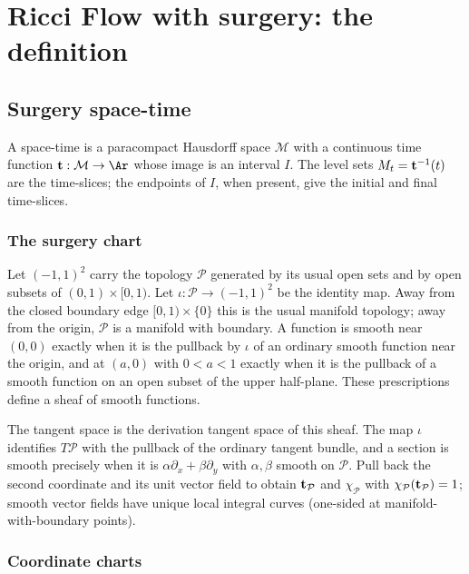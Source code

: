 \chapter{Ricci Flow with surgery: the definition}
\label{chap:ricci-flow-with-surgery}
\label{sect:surgery}

\section{Surgery space-time}

\begin{definition}
\label{def:space-time-general}
A space-time is a paracompact Hausdorff space ${\mathcal M}$ with a continuous
time function ${\bf t}:{\mathcal M}\to\Ar$ whose image is an interval $I$.
The level sets $M_t={\bf t}^{-1}(t)$ are the time-slices; the endpoints of $I$,
when present, give the initial and final time-slices.
\end{definition}

\subsection{The surgery chart}

Let $(-1,1)^2$ carry the topology ${\mathcal P}$ generated by its usual open
sets and by open subsets of $(0,1)\times[0,1)$. Let
$\iota:{\mathcal P}\to(-1,1)^2$ be the identity map. Away from the closed
boundary edge $[0,1)\times\{0\}$ this is the usual manifold topology; away
from the origin, ${\mathcal P}$ is a manifold with boundary. A function is
smooth near $(0,0)$ exactly when it is the pullback by $\iota$ of an ordinary
smooth function near the origin, and at $(a,0)$ with $0<a<1$ exactly when it is
the pullback of a smooth function on an open subset of the upper half-plane.
These prescriptions define a sheaf of smooth functions.

The tangent space is the derivation tangent space of this sheaf. The map
$\iota$ identifies $T{\mathcal P}$ with the pullback of the ordinary tangent
bundle, and a section is smooth precisely when it is
$\alpha\partial_x+\beta\partial_y$ with $\alpha,\beta$ smooth on
${\mathcal P}$. Pull back the second coordinate and its unit vector field to
obtain ${\bf t}_{\mathcal P}$ and $\chi_{\mathcal P}$ with
$\chi_{\mathcal P}({\bf t}_{\mathcal P})=1$; smooth vector fields have unique
local integral curves (one-sided at manifold-with-boundary points).

\subsection{Coordinate charts}

